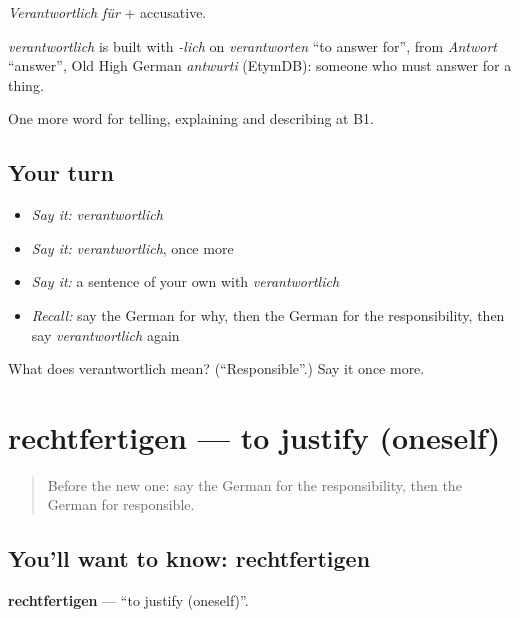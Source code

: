 \emph{Verantwortlich für} + accusative.

\begin{cousinweb}
\emph{verantwortlich} is built with \emph{-lich} on \emph{verantworten} \textquotedblleft{}to answer for\textquotedblright{}, from \emph{Antwort} \textquotedblleft{}answer\textquotedblright{}, Old High German \emph{antwurti} (EtymDB): someone who must answer for a thing.
\end{cousinweb}

\begin{grammarlens}[title={What you've built}]
One more word for telling, explaining and describing at B1.
\end{grammarlens}

\subsection*{Your turn}
\begin{itemize}
\raggedright
  \item \emph{Say it:} \emph{verantwortlich}
  \item \emph{Say it:} \emph{verantwortlich}, once more
  \item \emph{Say it:} a sentence of your own with \emph{verantwortlich}
  \item \emph{Recall:} say the German for why, then the German for the responsibility, then say \emph{verantwortlich} again
\end{itemize}

\begin{tcolorbox}[breakable,colback=teal!4,colframe=teal!35!black,title={Before you move on}]
What does verantwortlich mean? (\textquotedblleft{}Responsible\textquotedblright{}.) Say it once more.
\end{tcolorbox}
\section[rechtfertigen]{rechtfertigen — to justify (oneself)}

\label{lesson:GE-C348-rechtfertigen}



\begin{quote}
Before the new one: say the German for the responsibility, then the German for responsible.
\end{quote}

\subsection*{You'll want to know: rechtfertigen}
\textbf{rechtfertigen} — \textquotedblleft{}to justify (oneself)\textquotedblright{}.

